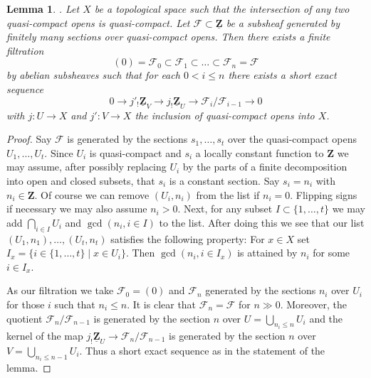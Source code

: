 \documentclass[10pt,a4paper]{amsart}
\theoremstyle{plain}
\newtheorem{lemma}[subsection]{Lemma}
\theoremstyle{definition}
\theoremstyle{remark}
\numberwithin{equation}{subsection}
\newenvironment{reference}{\comment}{\endcomment}
\begin{document}
\begin{lemma}
\label{lemma-subsheaf-of-constant-sheaf}
\begin{reference}
\cite[Page 168]{Tohoku}.
\end{reference}
Let $X$ be a topological space such that the intersection of any
two quasi-compact opens is quasi-compact. Let
$\mathcal{F} \subset \underline{\mathbf{Z}}$
be a subsheaf generated by finitely many sections over quasi-compact opens.
Then there exists a finite filtration
$$
(0) = \mathcal{F}_0 \subset \mathcal{F}_1 \subset \ldots \subset
\mathcal{F}_n = \mathcal{F}
$$
by abelian subsheaves such that for each $0 < i \leq n$
there exists a short exact sequence
$$
0 \to j'_!\underline{\mathbf{Z}}_V \to j_!\underline{\mathbf{Z}}_U \to
\mathcal{F}_i/\mathcal{F}_{i - 1} \to 0
$$
with $j : U \to X$ and $j' : V \to X$ the inclusion of quasi-compact opens
into $X$.
\end{lemma}

\begin{proof}
Say $\mathcal{F}$ is generated by the sections $s_1, \ldots, s_t$ over the
quasi-compact opens $U_1, \ldots, U_t$. Since $U_i$ is quasi-compact and
$s_i$ a locally constant function to $\mathbf{Z}$ we may assume, after
possibly replacing $U_i$ by the parts of a finite decomposition into open
and closed subsets, that $s_i$ is a constant section.
Say $s_i = n_i$ with $n_i \in \mathbf{Z}$. Of course we can remove
$(U_i, n_i)$ from the list if $n_i = 0$. Flipping signs if necessary
we may also assume $n_i > 0$. Next, for any subset $I \subset \{1, \ldots, t\}$
we may add $\bigcap_{i \in I} U_i$ and $\gcd(n_i, i \in I)$ to the list.
After doing this we see that our list $(U_1, n_1), \ldots, (U_t, n_t)$
satisfies the following property:
For $x \in X$ set $I_x = \{i \in \{1, \ldots, t\} \mid x \in U_i\}$.
Then $\gcd(n_i, i \in I_x)$ is attained by $n_i$ for some $i \in I_x$.

\medskip\noindent
As our filtration we take $\mathcal{F}_0 = (0)$ and
$\mathcal{F}_n$ generated by the sections $n_i$ over $U_i$ for those
$i$ such that $n_i \leq n$. It is clear that
$\mathcal{F}_n = \mathcal{F}$ for $n \gg 0$. Moreover, the quotient
$\mathcal{F}_n/\mathcal{F}_{n - 1}$ is generated by the section
$n$ over $U = \bigcup_{n_i \leq n} U_i$ and the kernel of the map
$j_!\underline{\mathbf{Z}}_U \to \mathcal{F}_n/\mathcal{F}_{n - 1}$
is generated by the section $n$ over $V = \bigcup_{n_i \leq n - 1} U_i$.
Thus a short exact sequence as in the statement of the lemma.
\end{proof}
\end{document}
